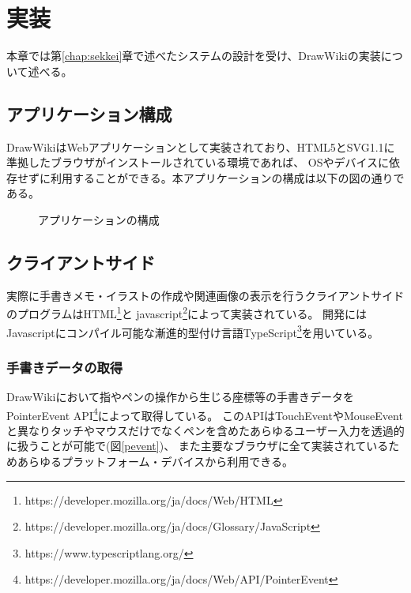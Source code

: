 \chapter{実装}
\label{chap:zissou}

本章では第\ref{chap:sekkei}章で述べたシステムの設計を受け、DrawWikiの実装について述べる。

\newpage

\section{アプリケーション構成}
DrawWikiはWebアプリケーションとして実装されており、HTML5とSVG1.1に準拠したブラウザがインストールされている環境であれば、
OSやデバイスに依存せずに利用することができる。本アプリケーションの構成は以下の図の通りである。

\begin{figure}[htbp]
    \begin{center}
         \end{center}
    \caption{アプリケーションの構成}
\end{figure}

\section{クライアントサイド}
実際に手書きメモ・イラストの作成や関連画像の表示を行うクライアントサイドのプログラムはHTML\footnote{https://developer.mozilla.org/ja/docs/Web/HTML}と
javascript\footnote{https://developer.mozilla.org/ja/docs/Glossary/JavaScript}によって実装されている。
開発にはJavascriptにコンパイル可能な漸進的型付け言語TypeScript\footnote{https://www.typescriptlang.org/}を用いている。

\subsection{手書きデータの取得}
DrawWikiにおいて指やペンの操作から生じる座標等の手書きデータをPointerEvent API\footnote{https://developer.mozilla.org/ja/docs/Web/API/PointerEvent}によって取得している。
このAPIはTouchEventやMouseEventと異なりタッチやマウスだけでなくペンを含めたあらゆるユーザー入力を透過的に扱うことが可能で(図\ref{pevent})、
また主要なブラウザに全て実装されているためあらゆるプラットフォーム・デバイスから利用できる。

